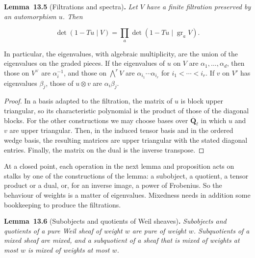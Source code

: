\documentclass[11pt]{article}
\newenvironment{bpstatement}[2]{\par\addvspace{0.6\baselineskip}\noindent\textbf{#1}#2\textbf{.}\enspace\ignorespaces}
  {\par\addvspace{0.4\baselineskip}}
\newenvironment{bpstatementit}[2]{\begin{bpstatement}{#1}{#2}\itshape\ignorespaces}{\end{bpstatement}}
\begin{document}
\label{bp19}%
\begin{bpstatementit}{Lemma~13.5}{ (Filtrations and spectra)}
Let \(V\) have a finite filtration preserved by an automorphism \(u\). Then

\[
\det(1-Tu\mid V)=\prod_a\det(1-Tu\mid\operatorname{gr}_aV).
\]

In particular, the eigenvalues, with algebraic multiplicity, are the union of the eigenvalues on the graded pieces. If the eigenvalues of \(u\) on \(V\) are \(\alpha_1,\ldots,\alpha_d\), then those on \(V^\vee\) are \(\alpha_i^{-1}\), and those on \(\bigwedge^rV\) are \(\alpha_{i_1}\cdots\alpha_{i_r}\) for \(i_1<\cdots<i_r\). If \(v\) on \(V'\) has eigenvalues \(\beta_j\), those of \(u\otimes v\) are \(\alpha_i\beta_j\).
\end{bpstatementit}

\begin{proof}[{Proof}]\label{bp20}%
In a basis adapted to the filtration, the matrix of \(u\) is block upper triangular, so its characteristic polynomial is the product of those of the diagonal blocks. For the other constructions we may choose bases over \(\overline{\mathbf Q}_\ell\) in which \(u\) and \(v\) are upper triangular. Then, in the induced tensor basis and in the ordered wedge basis, the resulting matrices are upper triangular with the stated diagonal entries. Finally, the matrix on the dual is the inverse transpose.
\end{proof}

\label{bp21}%
At a closed point, each operation in the next lemma and proposition acts on stalks by one of the constructions of the lemma: a subobject, a quotient, a tensor product or a dual, or, for an inverse image, a power of Frobenius. So the behaviour of weights is a matter of eigenvalues. Mixedness needs in addition some bookkeeping to produce the filtrations.

\label{bp22}%
\begin{bpstatementit}{Lemma~13.6}{ (Subobjects and quotients of Weil sheaves)}
Subobjects and quotients of a pure Weil sheaf of weight \(w\) are pure of weight \(w\). Subquotients of a mixed sheaf are mixed, and a subquotient of a sheaf that is mixed of weights at most \(w\) is mixed of weights at most \(w\).
\end{bpstatementit}
\end{document}
